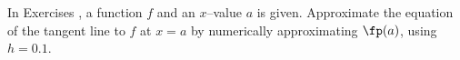 {\noindent In Exercises}
{, a function $f$ and an $x$--value $a$ is given. Approximate the equation of the tangent line to $f$ at $x=a$ by numerically approximating $\fp(a)$, using $h=0.1$.
}
